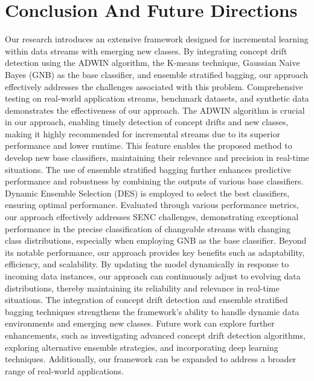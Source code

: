 \section{Conclusion And Future Directions}
\label{sec:5_8_Conclusions}
Our research introduces an extensive framework designed for incremental learning within data streams with emerging new classes. By integrating concept drift detection using the ADWIN algorithm, the K-means technique, Gaussian Naive Bayes (GNB) as the base classifier, and ensemble stratified bagging, our approach effectively addresses the challenges associated with this problem. Comprehensive testing on real-world application streams, benchmark datasets, and synthetic data demonstrates the effectiveness of our approach. The ADWIN algorithm is crucial in our approach, enabling timely detection of concept drifts and new classes, making it highly recommended for incremental streams due to its superior performance and lower runtime. This feature enables the proposed method to develop new base classifiers, maintaining their relevance and precision in real-time situations. The use of ensemble stratified bagging further enhances predictive performance and robustness by combining the outputs of various base classifiers. Dynamic Ensemble Selection (DES) is employed to select the best classifiers, ensuring optimal performance. Evaluated through various performance metrics, our approach effectively addresses SENC challenges, demonstrating exceptional performance in the precise classification of changeable streams with changing class distributions, especially when employing GNB as the base classifier. Beyond its notable performance, our approach provides key benefits such as adaptability, efficiency, and scalability. By updating the model dynamically in response to incoming data instances, our approach can continuously adjust to evolving data distributions, thereby maintaining its reliability and relevance in real-time situations. The integration of concept drift detection and ensemble stratified bagging techniques strengthens the framework’s ability to handle dynamic data environments and emerging new classes. Future work can explore further enhancements, such as investigating advanced concept drift detection algorithms, exploring alternative ensemble strategies, and incorporating deep learning techniques. Additionally, our framework can be expanded to address a broader range of real-world applications.